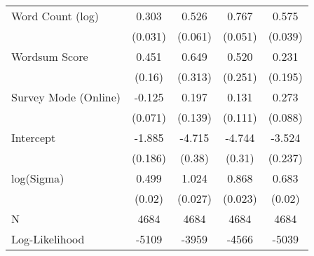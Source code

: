 \begin{table}[ht]
\begin{tabular}{lcccc}
  Word Count (log) &  0.303 &  0.526 &  0.767 &  0.575 \\ 
   & (0.031) & (0.061) & (0.051) & (0.039) \\ 
  Wordsum Score &  0.451 &  0.649 &  0.520 &  0.231 \\ 
   & (0.16) & (0.313) & (0.251) & (0.195) \\ 
  Survey Mode (Online) & -0.125 &  0.197 &  0.131 &  0.273 \\ 
   & (0.071) & (0.139) & (0.111) & (0.088) \\ 
  Intercept & -1.885 & -4.715 & -4.744 & -3.524 \\ 
   & (0.186) & (0.38) & (0.31) & (0.237) \\ 
  log(Sigma) &  0.499 &  1.024 &  0.868 &  0.683 \\ 
   & (0.02) & (0.027) & (0.023) & (0.02) \\ 
   \hline
N & 4684 & 4684 & 4684 & 4684 \\ 
  Log-Likelihood & -5109 & -3959 & -4566 & -5039 \\ 
   \hline
\end{tabular}
\endgroup
\end{table}
